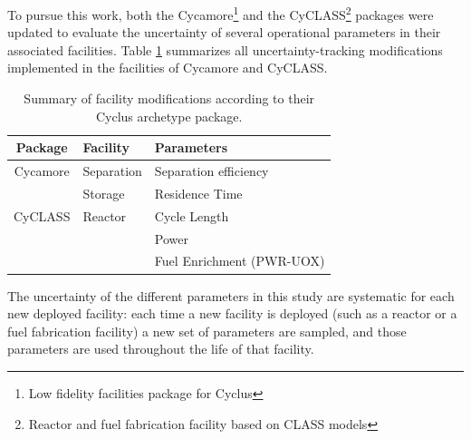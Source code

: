 \documentclass{anstrans}
\begin{document}
To pursue this work, both the Cycamore\footnote{Low
fidelity facilities package for Cyclus}\cite{cycamore} and the
CyCLASS\footnote{Reactor and fuel fabrication facility based on CLASS\cite{CLASS} models}\cite{mouginot_2018, cyclass} packages were
updated to evaluate the uncertainty of several
operational parameters in their associated facilities.  Table
\ref{tab:package_uncertainty} summarizes all uncertainty-tracking modifications implemented in the
facilities of Cycamore and CyCLASS.

\begin{table}[htb]
\centering
  \caption{Summary of facility modifications according to their Cyclus archetype package.}
\begin{tabular}{cl|l}
\toprule

Package   & Facility   & Parameters                \\
\toprule

Cycamore & Separation & Separation efficiency     \\\cmidrule{2-3} 
         & Storage    & Residence Time            \\
\toprule
CyCLASS  & Reactor    & Cycle Length              \\\cmidrule{3-3}
         &            & Power                     \\\cmidrule{3-3}
         &            & Fuel Enrichment (PWR-UOX) \\

\bottomrule
\end{tabular}

  \label{tab:package_uncertainty}
\end{table}

The uncertainty of the different parameters in this study
are systematic for each new deployed facility: each time a new facility is
deployed (such as a reactor or a fuel fabrication facility) a new set of
parameters are sampled, and those parameters are used throughout the life
of that facility.
\end{document}
